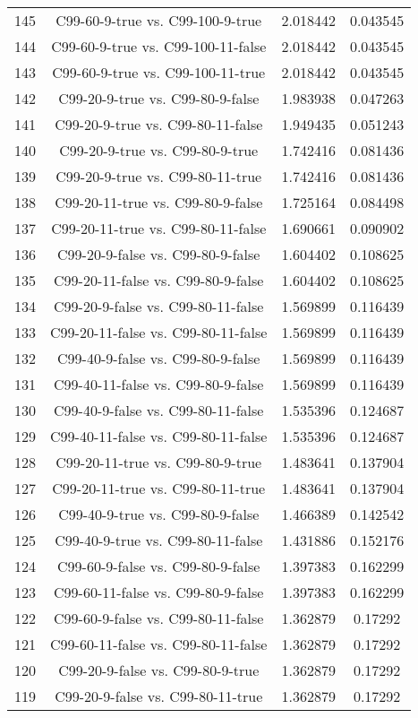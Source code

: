 \documentclass[a4paper,10pt]{article}
\begin{document}
\begin{landscape}
\begin{table}[!htp]
\begin{tabular}{cccc}
145&C99-60-9-true vs. C99-100-9-true&2.018442&0.043545\\
144&C99-60-9-true vs. C99-100-11-false&2.018442&0.043545\\
143&C99-60-9-true vs. C99-100-11-true&2.018442&0.043545\\
142&C99-20-9-true vs. C99-80-9-false&1.983938&0.047263\\
141&C99-20-9-true vs. C99-80-11-false&1.949435&0.051243\\
140&C99-20-9-true vs. C99-80-9-true&1.742416&0.081436\\
139&C99-20-9-true vs. C99-80-11-true&1.742416&0.081436\\
138&C99-20-11-true vs. C99-80-9-false&1.725164&0.084498\\
137&C99-20-11-true vs. C99-80-11-false&1.690661&0.090902\\
136&C99-20-9-false vs. C99-80-9-false&1.604402&0.108625\\
135&C99-20-11-false vs. C99-80-9-false&1.604402&0.108625\\
134&C99-20-9-false vs. C99-80-11-false&1.569899&0.116439\\
133&C99-20-11-false vs. C99-80-11-false&1.569899&0.116439\\
132&C99-40-9-false vs. C99-80-9-false&1.569899&0.116439\\
131&C99-40-11-false vs. C99-80-9-false&1.569899&0.116439\\
130&C99-40-9-false vs. C99-80-11-false&1.535396&0.124687\\
129&C99-40-11-false vs. C99-80-11-false&1.535396&0.124687\\
128&C99-20-11-true vs. C99-80-9-true&1.483641&0.137904\\
127&C99-20-11-true vs. C99-80-11-true&1.483641&0.137904\\
126&C99-40-9-true vs. C99-80-9-false&1.466389&0.142542\\
125&C99-40-9-true vs. C99-80-11-false&1.431886&0.152176\\
124&C99-60-9-false vs. C99-80-9-false&1.397383&0.162299\\
123&C99-60-11-false vs. C99-80-9-false&1.397383&0.162299\\
122&C99-60-9-false vs. C99-80-11-false&1.362879&0.17292\\
121&C99-60-11-false vs. C99-80-11-false&1.362879&0.17292\\
120&C99-20-9-false vs. C99-80-9-true&1.362879&0.17292\\
119&C99-20-9-false vs. C99-80-11-true&1.362879&0.17292\\

\end{tabular}
\end{table}
\end{landscape}
\end{document}
